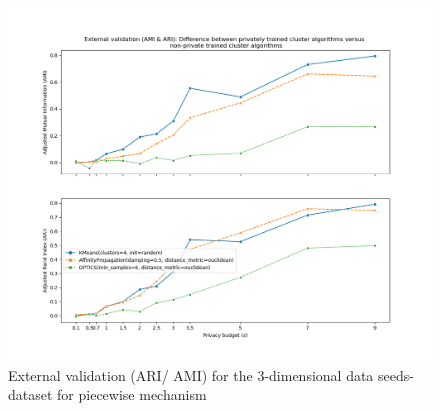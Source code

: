 \begin{figure}[H]
\begin{minipage}[c]{0.49\textwidth}
        \includegraphics[width=1\textwidth]{Results/3d-piecewise/seeds-dataset/ami-and-ari.png}
        \caption{External validation (ARI/ AMI) for the 3-dimensional data seeds-dataset for piecewise mechanism}
        \label{fig:external-validation-seeds-dataset_comparison_3d-piecewise}
    \end{minipage}

\end{figure}
